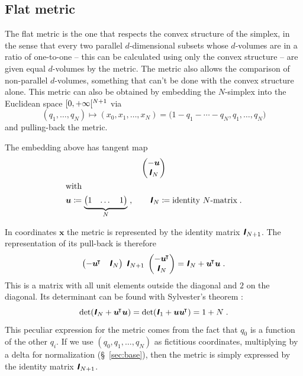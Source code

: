 \documentclass[\ifafour a4paper,12pt,\else a5paper,10pt,\fi%
onecolumn,oneside,article,%
british%
]{memoir}
\theoremstyle{remark}
\theoremstyle{innote}
\newcommand*{\mathte}[1]{\textbf{\textit{\textsf{#1}}}}
\newcommand*{\citep}{\parencites}
\newcommand*{\defd}{\coloneqq}
\DeclarePairedDelimiter\clop{[}{[}
\renewcommand*{\|}[1][]{\nonscript\,#1\vert\nonscript\;\mathopen{}}
\newcommand*{\sect}{\S}%
\newcommand*{\T}{^{\mathord{\!\intercal}}}%
\newcommand*{\yu}{\bm{u}}
\newcommand*{\yid}{\mathte{I}}
\newcommand*{\yx}{\bm{x}}
\begin{document}
\subsection{Flat metric}
\label{sec:flat_metric}

The flat metric is the one that respects the convex structure of the
simplex, in the sense that every two parallel $d$-dimensional subsets whose
$d$-volumes are in a ratio of one-to-one -- this can be calculated using
only the convex structure \citep{portamana2011_r2019} -- are given equal
$d$-volumes by the metric. The metric also allows the comparison of
non-parallel $d$-volumes, something that can't be done with the convex
structure alone. This metric can also be obtained by embedding the
$N$-simplex into the Euclidean space $\clop{0,+\infty}^{N+1}$ via
\begin{equation}
  \label{eq:flat_embedding}
  (q_1, \dotsc, q_N) \mapsto (x_0, x_1,\dotsc, x_N) =
  \bigl( 1-q_1 -\dotsb -q_N, q_1, \dotsc, q_N \bigr)
\end{equation}
and pulling-back the metric.

The embedding above has tangent map
\begin{gather}
  \label{eq:tangent_map_canonical}
  \begin{pmatrix}
-\yu \\ \yid_N    
\end{pmatrix}
\\\shortintertext{with}
\label{eq:def_u}
\yu \defd
\underbrace{\begin{pmatrix}
  1 &\dotso &1
\end{pmatrix}}_{N}\;,
\qquad
\yid_{N} \defd \text{identity $N$-matrix}\;.
\end{gather}

In coordinates $\yx$ the metric is represented by the identity matrix
$\yid_{N+1}$. The representation of its pull-back is therefore
\begin{equation}
  \label{eq:metric_pullback}
  \begin{pmatrix}
-\yu\T & \yid_N    
\end{pmatrix}
\;
\yid_{N+1}
\;
  \begin{pmatrix}
-\yu\T \\ \yid_N    
\end{pmatrix}
= \yid_N + \yu\T\yu\;.
\end{equation}
This is a matrix with all unit elements outside the diagonal and $2$ on the
diagonal. Its determinant can be found with Sylvester's theorem
\citep{sylvester1851,akritasetal1996}:
\begin{equation}
  \label{eq:sylvester}
  \det(\yid_N + \yu\T\yu) = \det(\yid_1 + \yu\yu\T) = 1 + N\;.
\end{equation}
This peculiar expression for the metric comes from the fact that $q_0$ is
a function of the other $q_i$. If we use $(q_0, q_1, \dotsc, q_N)$
as fictitious coordinates, multiplying by a delta for normalization
(\sect~\ref{sec:base}), then the metric is simply expressed by the identity
matrix $\yid_{N+1}$.
\end{document}
